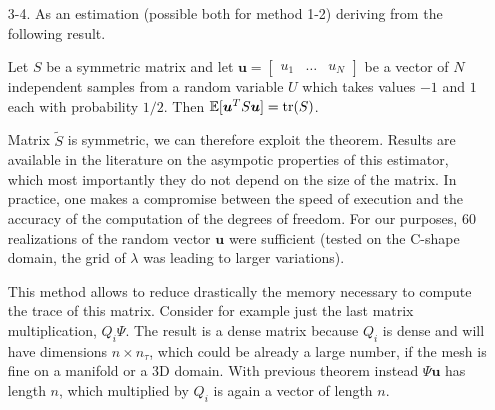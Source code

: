 \begin{enumerate}
	\item[3-4.] As an estimation (possible both for method 1-2) deriving from the following result.
		\begin{theorem}[Hutchinson]
			Let $S$ be a symmetric matrix and let $\bm{u} =
				\begin{bmatrix}
					u_1 & \dots & u_N
				\end{bmatrix}
			$ be a vector of $N$ independent samples from a random variable $U$
			which takes values $-1$ and $1$ each with probability $1/2$. Then
			$\mathbb{E}[\bm{u}^TS\bm{u}] = \operatorname*{tr} (S)$.
		\end{theorem}
		Matrix $\tilde{S}$ is symmetric, we can therefore exploit the theorem.
		Results are available in the literature on the asympotic properties of this
		estimator, which most importantly they do not depend on the size of the matrix.
		In practice, one makes a compromise between the speed of execution and the
		accuracy of the computation of the degrees of freedom. For our purposes, 60
		realizations of the random vector $\bm{u}$ were sufficient (tested on the
		C-shape domain, the grid of $\lambda$ was leading to larger variations).

		This method allows to reduce drastically the memory necessary to compute the
		trace of this matrix. Consider for example just the last matrix multiplication,
		$Q_i \Psi$. The result is a dense matrix because $Q_i$ is dense and will have
		dimensions $n \times n_{\tau}$, which could be already a large number, if the
		mesh is fine on a manifold or a 3D domain. With previous theorem instead $\Psi
			\bm{u}$ has length $n$, which multiplied by $Q_i$ is again a vector of length
		$n$.
\end{enumerate}
